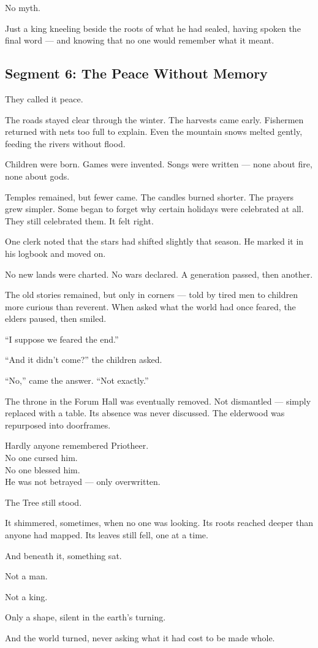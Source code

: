 \documentclass[9pt]{article}
\begin{document}
No myth.

Just a king kneeling beside the roots of what he had sealed, having spoken the final word — and knowing that no one would remember what it meant.


\newpage

\subsection*{Segment 6: The Peace Without Memory}

They called it peace.

The roads stayed clear through the winter. The harvests came early. Fishermen returned with nets too full to explain. Even the mountain snows melted gently, feeding the rivers without flood.

Children were born. Games were invented. Songs were written — none about fire, none about gods.

Temples remained, but fewer came. The candles burned shorter. The prayers grew simpler. Some began to forget why certain holidays were celebrated at all. They still celebrated them. It felt right.

One clerk noted that the stars had shifted slightly that season. He marked it in his logbook and moved on.

No new lands were charted. No wars declared. A generation passed, then another.

The old stories remained, but only in corners — told by tired men to children more curious than reverent. When asked what the world had once feared, the elders paused, then smiled.

``I suppose we feared the end.''

``And it didn’t come?'' the children asked.

``No,'' came the answer. ``Not exactly.''

The throne in the Forum Hall was eventually removed. Not dismantled — simply replaced with a table. Its absence was never discussed. The elderwood was repurposed into doorframes.

Hardly anyone remembered Priotheer.\\
No one cursed him.\\
No one blessed him.\\
He was not betrayed — only overwritten.

The Tree still stood.

It shimmered, sometimes, when no one was looking. Its roots reached deeper than anyone had mapped. Its leaves still fell, one at a time.

And beneath it, something sat.

Not a man.

Not a king.

Only a shape, silent in the earth’s turning.

And the world turned, never asking what it had cost to be made whole.


\newpage
\end{document}

